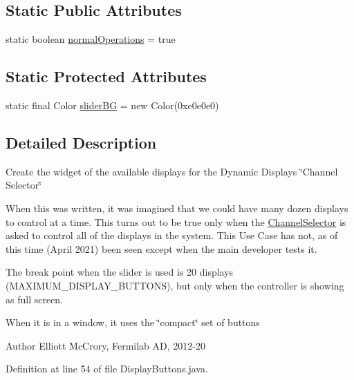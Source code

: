 \subsection*{Static Public Attributes}
\begin{DoxyCompactItemize}
\item 
static boolean \hyperlink{classgov_1_1fnal_1_1ppd_1_1dd_1_1changer_1_1DisplayButtons_aee30976132133400c5f8cb6a48599aa9}{normal\-Operations} = true
\end{DoxyCompactItemize}
\subsection*{Static Protected Attributes}
\begin{DoxyCompactItemize}
\item 
static final Color \hyperlink{classgov_1_1fnal_1_1ppd_1_1dd_1_1changer_1_1DisplayButtons_ab2b83431c13a58c3f26a01086ec4ac8d}{slider\-B\-G} = new Color(0xe0e0e0)
\end{DoxyCompactItemize}


\subsection{Detailed Description}
Create the widget of the available displays for the Dynamic Displays \char`\"{}\-Channel Selector\char`\"{}

When this was written, it was imagined that we could have many dozen displays to control at a time. This turns out to be true only when the \hyperlink{classgov_1_1fnal_1_1ppd_1_1dd_1_1ChannelSelector}{Channel\-Selector} is asked to control all of the displays in the system. This Use Case has not, as of this time (April 2021) been seen except when the main developer tests it.

The break point when the slider is used is 20 displays (M\-A\-X\-I\-M\-U\-M\-\_\-\-D\-I\-S\-P\-L\-A\-Y\-\_\-\-B\-U\-T\-T\-O\-N\-S), but only when the controller is showing as full screen.

When it is in a window, it uses the \char`\"{}compact\char`\"{} set of buttons

\begin{DoxyAuthor}{Author}
Elliott Mc\-Crory, Fermilab A\-D, 2012-\/20 
\end{DoxyAuthor}


Definition at line 54 of file Display\-Buttons.\-java.



